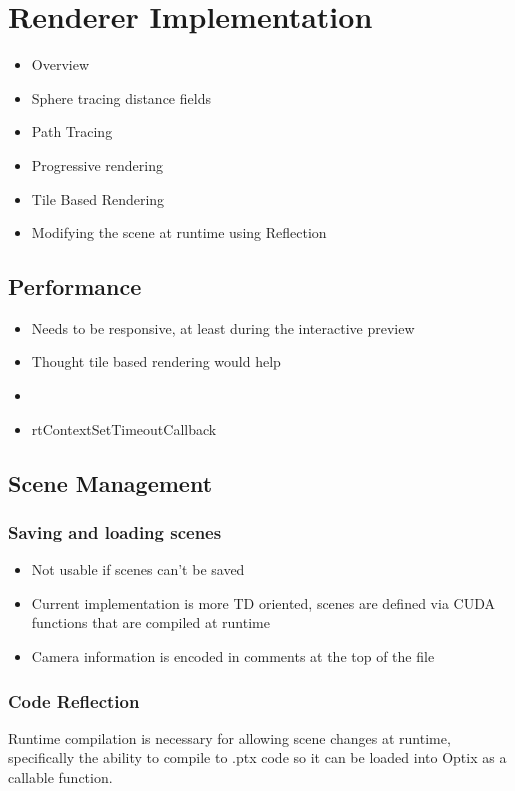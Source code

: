 \documentclass[11pt,a4paper,final,notitlepage]{report}
\begin{document}
\chapter{Renderer Implementation}

\begin{itemize}
	\item Overview
	\item Sphere tracing distance fields
	\item Path Tracing
	\item Progressive rendering
	\item Tile Based Rendering
	\item Modifying the scene at runtime using Reflection
\end{itemize}

\section{Performance}

\begin{itemize}
	\item Needs to be responsive, at least during the interactive preview
	\item Thought tile based rendering would help
	\item 
	\item rtContextSetTimeoutCallback
\end{itemize}


\section{Scene Management}

\subsection{Saving and loading scenes}
\begin{itemize}
	\item Not usable if scenes can't be saved
	\item Current implementation is more TD oriented, scenes are defined via CUDA functions that are compiled at runtime
	\item Camera information is encoded in comments at the top of the file
\end{itemize}

\subsection{Code Reflection}
Runtime compilation is necessary for allowing scene changes at runtime, specifically the ability to compile to .ptx code so it can be loaded into Optix as a callable function.
\end{document}
